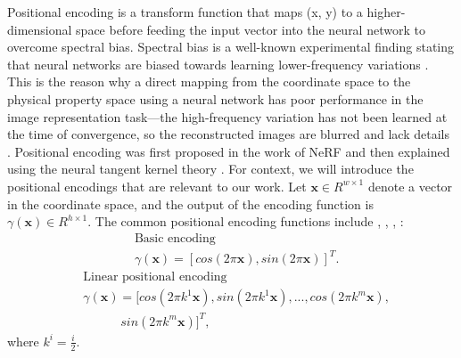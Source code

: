 \documentclass[lettersize,journal]{IEEEtran}
\begin{document}
Positional encoding is a transform function that maps (x, y) to a higher-dimensional space before feeding the input vector into the neural network to overcome spectral bias. Spectral bias is a well-known experimental finding stating that neural networks are biased towards learning lower-frequency variations \cite{rahaman2019spectralbiasneuralnetworks}. This is the reason why a direct mapping from the coordinate space to the physical property space using a neural network has poor performance in the image representation task---the high-frequency variation has not been learned at the time of convergence, so the reconstructed images are blurred and lack details \cite{rahaman2019spectralbiasneuralnetworks}. 
Positional encoding was first proposed in the work of NeRF \cite{10.1145/3503250} and then explained using the neural tangent kernel theory \cite{tancik2020fourierfeaturesletnetworks}. For context, we will introduce the positional encodings that are relevant to our work.
Let $\textbf{x} \in R^{w \times 1}$ denote a vector in the coordinate space, and the output of the encoding function is $\gamma(\textbf{x}) \in R^{h \times 1}$. The common positional encoding functions include \cite{10.1145/3503250}, \cite{9606601}, \cite{tancik2020fourierfeaturesletnetworks}, \cite{sun_coil_2021}:
\begin{equation}
\label{Basic encoding}
\begin{aligned}
& \textrm{Basic encoding} \\
& \gamma(\textbf{x}) = [cos(2\pi\textbf{x}), sin(2\pi\textbf{x})]^{T}.
\end{aligned}
\end{equation}
\begin{equation}
\label{linear encoding}
\begin{aligned}
& \textrm{Linear positional encoding} \\
& \gamma(\textbf{x}) = [cos(2\pi k^{1}\textbf{x}), sin(2\pi k^{1}\textbf{x}),...,cos(2\pi k^{m}\textbf{x}), \\
& \quad \quad \quad sin(2\pi k^{m}\textbf{x})]^{T},
\end{aligned}
\end{equation}
where $k^{i} = \frac{i}{2}$.
\end{document}

